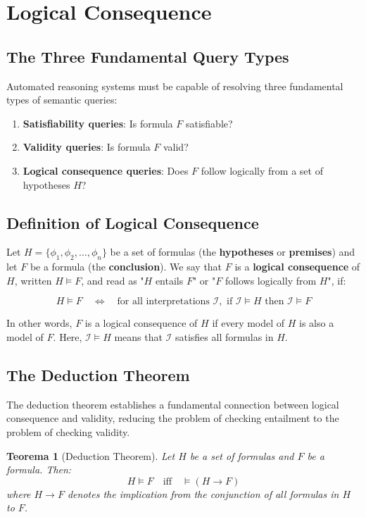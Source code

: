 \documentclass[11pt,a4paper]{article}
\theoremstyle{definition}
\theoremstyle{plain}
\newtheorem{theorem}{Teorema}[section]
\theoremstyle{remark}
\begin{document}
\section{Logical Consequence}

\subsection{The Three Fundamental Query Types}

Automated reasoning systems must be capable of resolving three fundamental types of semantic queries:
\begin{enumerate}
    \item \textbf{Satisfiability queries}: Is formula $F$ satisfiable?
    \item \textbf{Validity queries}: Is formula $F$ valid?
    \item \textbf{Logical consequence queries}: Does $F$ follow logically from a set of hypotheses $H$?
\end{enumerate}

\subsection{Definition of Logical Consequence}

Let $H = \{\phi_1, \phi_2, \dots, \phi_n\}$ be a set of formulas (the \textbf{hypotheses} or \textbf{premises}) and let $F$ be a formula (the \textbf{conclusion}). We say that $F$ is a \textbf{logical consequence} of $H$, written $H \models F$, and read as "$H$ entails $F$" or "$F$ follows logically from $H$", if:

\[
H \models F \quad \Leftrightarrow \quad \text{for all interpretations } \mathcal{I}, \text{ if } \mathcal{I} \models H \text{ then } \mathcal{I} \models F
\]

In other words, $F$ is a logical consequence of $H$ if every model of $H$ is also a model of $F$. Here, $\mathcal{I} \models H$ means that $\mathcal{I}$ satisfies all formulas in $H$.

\subsection{The Deduction Theorem}

The deduction theorem establishes a fundamental connection between logical consequence and validity, reducing the problem of checking entailment to the problem of checking validity.

\begin{theorem}[Deduction Theorem]
Let $H$ be a set of formulas and $F$ be a formula. Then:
\[
H \models F \quad \text{iff} \quad \models (H \rightarrow F)
\]
where $H \rightarrow F$ denotes the implication from the conjunction of all formulas in $H$ to $F$.
\end{theorem}
\end{document}
